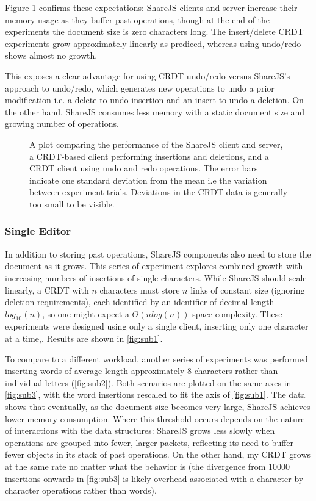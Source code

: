 \documentclass[12pt,a4paper,twoside,openright]{report}
\begin{document}
						Figure \ref{fig:sanitycheck} confirms these expectations: ShareJS clients and server increase their memory usage as they buffer past operations, though at the end of the experiments the document size is zero characters long. The insert/delete CRDT experiments grow approximately linearly as prediced, whereas using undo/redo shows almost no growth. 
						
										
						This exposes a clear advantage for using CRDT undo/redo versus ShareJS's approach to undo/redo, which generates new operations to undo a prior modification i.e. a delete to undo insertion and an insert to undo a deletion. On the other hand, ShareJS consumes less memory with a static document size and growing number of operations.
								
				\begin{figure}[H]
					\centering
					
					\caption[Memory Consumption Sanity Check] {A plot comparing the performance of the ShareJS client and server, a CRDT-based client performing insertions and deletions, and a CRDT client using undo and redo operations. The error bars indicate one standard deviation from the mean i.e the variation between experiment trials. Deviations in the CRDT data is generally too small to be visible.}
					\label{fig:sanitycheck}
				\end{figure}

		
			\subsubsection{Single Editor} \label{sec:singleeditor}
				In addition to storing past operations, ShareJS components also need to store the document as it grows. This series of experiment explores combined growth with increasing numbers of insertions of single characters. While ShareJS should scale linearly, a CRDT with $n$ characters must store $n$ links of constant size (ignoring deletion requirements), each identified by an identifier of decimal length $log_{10}(n)$, so one might expect a $\Theta (nlog(n))$ space complexity. These experiments were designed using only a single client, inserting only one character at a time,. Results are shown in \ref{fig:sub1}.
					
				To compare to a different workload, another series of experiments was performed inserting words of average length approximately 8 characters rather than individual letters (\ref{fig:sub2}). Both scenarios are plotted on the same axes in \ref{fig:sub3}, with the word insertions rescaled to fit the axis of \ref{fig:sub1}. The data shows that eventually, as the document size becomes very large, ShareJS achieves lower memory consumption. Where this threshold occurs depends on the nature of interactions with the data structures: ShareJS grows less slowly when operations are grouped into fewer, larger packets, reflecting its need to buffer fewer objects in its stack of past operations. On the other hand, my CRDT grows at the same rate no matter what the behavior is (the divergence from 10000 insertions onwards in \ref{fig:sub3} is likely overhead associated with a character by character operations rather than words). 
				
\end{document}
